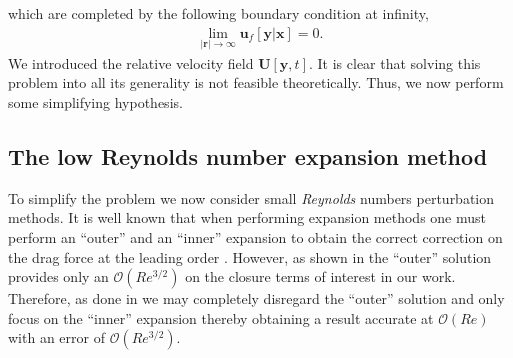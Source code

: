 which are completed by the following boundary condition at infinity,
\begin{align*}
    \lim_{|\textbf{r}|\to\infty }\textbf{u}_f[\textbf{y}|\textbf{x}] = 0. 
\end{align*}
We introduced the relative velocity field $\textbf{U}[\textbf{y},t]$. 
It is clear that solving this problem into all its generality is not feasible theoretically.
Thus, we now perform some simplifying hypothesis. 

\subsection{The low Reynolds number expansion method}

To simplify the problem we now consider small \textit{Reynolds} numbers perturbation methods. 
It is well known that when performing expansion methods one must perform an ``outer'' and an ``inner'' expansion to obtain the correct correction on the drag force at the leading order \citet{proudman1957expansions}. 
However, as shown in \citet{masoud2019reciprocal} the ``outer'' solution provides only an $\mathcal{O}(Re^{3/2})$ on the closure terms of interest in our work.
Therefore, as done in \citet{raja2010inertial} we may completely disregard the ``outer'' solution and only focus on the ``inner'' expansion thereby obtaining a result accurate at $\mathcal{O}(Re)$ with an error of $\mathcal{O}(Re^{3/2})$. 

